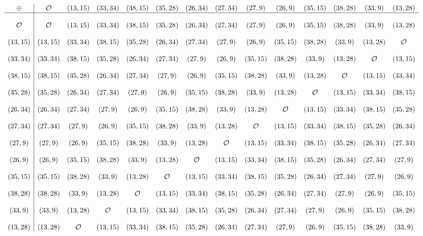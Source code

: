 $$
\begin{array}{c|ccccccccccccc}
\oplus & \mathcal{O}  & (13,15) & (33,34) & (38,15) & (35,28) & (26,34) & (27,34) & (27,9) & (26,9) & (35,15) & (38,28) & (33,9) & (13,28)\\
\hline
\\
\mathcal{O} & \mathcal{O}  & (13,15) & (33,34) & (38,15) & (35,28) & (26,34) & (27,34) & (27,9) & (26,9) & (35,15) & (38,28) & (33,9) & (13,28)\\
\\
(13,15) & (13,15) & (33,34) & (38,15) & (35,28) & (26,34) & (27,34) & (27,9) & (26,9) & (35,15) & (38,28) & (33,9) & (13,28) & \mathcal{O}\\
\\
(33,34) & (33,34) & (38,15) & (35,28) & (26,34) & (27,34) & (27,9) & (26,9) & (35,15) & (38,28) & (33,9) & (13,28) & \mathcal{O} & (13,15)\\
\\
(38,15) & (38,15) & (35,28) & (26,34) & (27,34) & (27,9) & (26,9) & (35,15) & (38,28) & (33,9) & (13,28) & \mathcal{O} & (13,15) & (33,34)\\
\\
(35,28) & (35,28) & (26,34) & (27,34) & (27,9) & (26,9) & (35,15) & (38,28) & (33,9) & (13,28) & \mathcal{O} & (13,15) & (33,34) & (38,15)\\
\\
(26,34) & (26,34) & (27,34) & (27,9) & (26,9) & (35,15) & (38,28) & (33,9) & (13,28) & \mathcal{O} & (13,15) & (33,34) & (38,15) & (35,28)\\
\\
(27,34) & (27,34) & (27,9) & (26,9) & (35,15) & (38,28) & (33,9) & (13,28) & \mathcal{O} & (13,15) & (33,34) & (38,15) & (35,28) & (26,34)\\
\\
(27,9) & (27,9) & (26,9) & (35,15) & (38,28) & (33,9) & (13,28) & \mathcal{O} & (13,15) & (33,34) & (38,15) & (35,28) & (26,34) & (27,34)\\
\\
(26,9) & (26,9) & (35,15) & (38,28) & (33,9) & (13,28) & \mathcal{O} & (13,15) & (33,34) & (38,15) & (35,28) & (26,34) & (27,34) & (27,9)\\
\\
(35,15) & (35,15) & (38,28) & (33,9) & (13,28) & \mathcal{O} & (13,15) & (33,34) & (38,15) & (35,28) & (26,34) & (27,34) & (27,9) & (26,9)\\
\\
(38,28) & (38,28) & (33,9) & (13,28) & \mathcal{O} & (13,15) & (33,34) & (38,15) & (35,28) & (26,34) & (27,34) & (27,9) & (26,9) & (35,15)\\
\\
(33,9) & (33,9) & (13,28) & \mathcal{O} & (13,15) & (33,34) & (38,15) & (35,28) & (26,34) & (27,34) & (27,9) & (26,9) & (35,15) & (38,28)\\
\\
(13,28) & (13,28) & \mathcal{O} & (13,15) & (33,34) & (38,15) & (35,28) & (26,34) & (27,34) & (27,9) & (26,9) & (35,15) & (38,28) & (33,9)\\
\end{array}
$$

